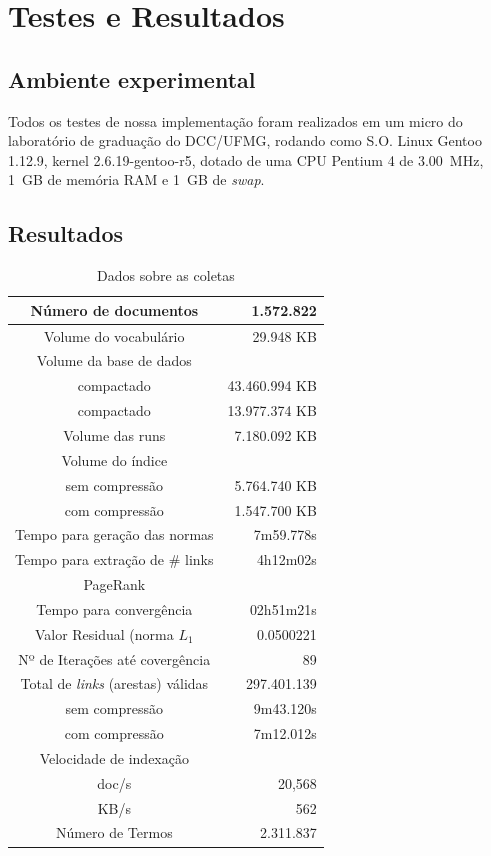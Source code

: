\documentclass[10pt,twocolumn]{article}
\begin{document}
\section{Testes e Resultados}

\subsection{Ambiente experimental}

Todos os testes de nossa implementação foram realizados em um micro do
laboratório de graduação do DCC/UFMG, rodando como S.O. Linux Gentoo
1.12.9, kernel 2.6.19-gentoo-r5, dotado de uma CPU Pentium 4 de
3.00~MHz, 1~GB de memória RAM e 1~GB de \emph{swap}.

\subsection{Resultados}

\begin{table}[htbp]
\centering
\begin{tabular}{|c|r|} \hline
Número de documentos			& 1.572.822		\\\hline
Volume do vocabulário			&	      29.948 KB \\\hline
Volume da base de dados 		&   			\\
          compactado 			&            43.460.994 KB \\
          compactado 			&   	  13.977.374 KB \\\hline
Volume das runs 			&	   7.180.092 KB \\\hline
Volume do índice  			&			\\
  sem compressão  			&	   5.764.740 KB \\
  com compressão  			&	   1.547.700 KB \\\hline
Tempo para geração das normas 		&	    7m59.778s	\\ \hline
Tempo para extração de \# links		&		4h12m02s \\ \hline
PageRank				& 		\\
Tempo para convergência& 02h51m21s	\\
Valor Residual (norma \(L_1\)		& 	0.0500221 \\
Nº de Iterações até covergência		& 	89	\\ \hline
Total de \emph{links} (arestas) válidas & 297.401.139	\\ \hline
  sem compressão 			&	   9m43.120s \\
  com compressão  			&	   7m12.012s \\\hline
Velocidade de indexação			&		\\
  doc/s		  			& 20,568		\\
  KB/s					& 562			\\\hline
Número de Termos			&     2.311.837	\\\hline
\hline
\end{tabular}
\caption{Dados sobre as coletas}
\label{tab:sumario}
\end{table}
\end{document}
